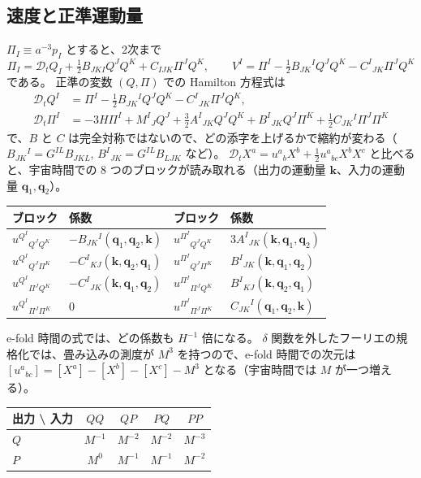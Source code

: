\documentclass[a4paper,11pt]{ltjsarticle}
\newcommand{\Dt}{\mathcal{D}_t}
\begin{document}
\subsection{速度と正準運動量}
$\Pi_I\equiv a^{-3}p_I$ とすると、2次まで
\[
\Pi_I=\Dt Q_I+\tfrac12B_{JKI}Q^JQ^K+C_{IJK}\Pi^JQ^K,\qquad
V^I=\Pi^I-\tfrac12B_{JK}{}^IQ^JQ^K-C^I{}_{JK}\Pi^JQ^K
\]
である。
正準の変数 $(Q,\Pi)$ での Hamilton 方程式は
\begin{align*}
\Dt Q^I&=\Pi^I-\tfrac12B_{JK}{}^IQ^JQ^K-C^I{}_{JK}\Pi^JQ^K,\\
\Dt\Pi^I&=-3H\Pi^I+M^I{}_JQ^J+\tfrac32A^I{}_{JK}Q^JQ^K+B^I{}_{JK}Q^J\Pi^K+\tfrac12C_{JK}{}^I\Pi^J\Pi^K
\end{align*}
で、$B$ と $C$ は完全対称ではないので、どの添字を上げるかで縮約が変わる（$B_{JK}{}^I=G^{IL}B_{JKL}$, $B^I{}_{JK}=G^{IL}B_{LJK}$ など）。
$\Dt X^a=u^a{}_bX^b+\tfrac12u^a{}_{bc}X^bX^c$ と比べると、宇宙時間での 8 つのブロックが読み取れる（出力の運動量 $\mathbf k$、入力の運動量 $\mathbf q_1,\mathbf q_2$）。
\begin{center}
\small
\begin{tabular}{ll@{\qquad}ll}
\toprule
ブロック & 係数 & ブロック & 係数 \\
\midrule
$u^{Q^I}{}_{Q^JQ^K}$ & $-B_{JK}{}^I(\mathbf q_1,\mathbf q_2,\mathbf k)$ & $u^{\Pi^I}{}_{Q^JQ^K}$ & $3A^I{}_{JK}(\mathbf k,\mathbf q_1,\mathbf q_2)$ \\
$u^{Q^I}{}_{Q^J\Pi^K}$ & $-C^I{}_{KJ}(\mathbf k,\mathbf q_2,\mathbf q_1)$ & $u^{\Pi^I}{}_{Q^J\Pi^K}$ & $B^I{}_{JK}(\mathbf k,\mathbf q_1,\mathbf q_2)$ \\
$u^{Q^I}{}_{\Pi^JQ^K}$ & $-C^I{}_{JK}(\mathbf k,\mathbf q_1,\mathbf q_2)$ & $u^{\Pi^I}{}_{\Pi^JQ^K}$ & $B^I{}_{KJ}(\mathbf k,\mathbf q_2,\mathbf q_1)$ \\
$u^{Q^I}{}_{\Pi^J\Pi^K}$ & $0$ & $u^{\Pi^I}{}_{\Pi^J\Pi^K}$ & $C_{JK}{}^I(\mathbf q_1,\mathbf q_2,\mathbf k)$ \\
\bottomrule
\end{tabular}
\end{center}
e-fold 時間の式では、どの係数も $H^{-1}$ 倍になる。
$\delta$ 関数を外したフーリエの規格化では、畳み込みの測度が $M^3$ を持つので、e-fold 時間での次元は $[u^a{}_{bc}]=[X^a]-[X^b]-[X^c]-M^3$ となる（宇宙時間では $M$ が一つ増える）。
\begin{center}
\begin{tabular}{lcccc}
\toprule
出力 \textbackslash{} 入力 & $QQ$ & $QP$ & $PQ$ & $PP$ \\
\midrule
$Q$ & $M^{-1}$ & $M^{-2}$ & $M^{-2}$ & $M^{-3}$ \\
$P$ & $M^0$ & $M^{-1}$ & $M^{-1}$ & $M^{-2}$ \\
\bottomrule
\end{tabular}
\end{center}
\end{document}
